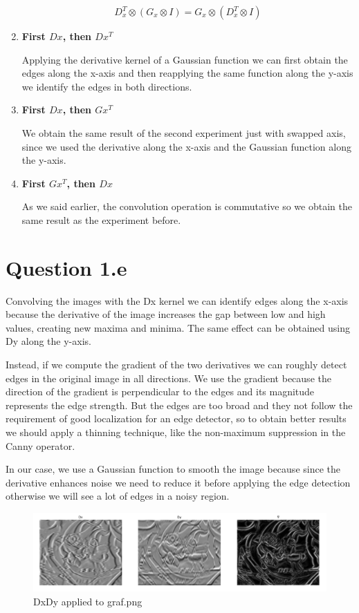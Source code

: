 \documentclass{article}
\begin{document}
\begin{enumerate}
\begin{equation}
D_x^T \otimes (G_x \otimes I) = G_x \otimes (D_x^T \otimes I)
\end{equation}

\item \textbf{First $Dx$, then $Dx^T$}

Applying the derivative kernel of a Gaussian function we can first obtain the edges along the x-axis and then reapplying the same function along the y-axis we identify the edges in both directions.

\item \textbf{First $Dx$, then $Gx^T$}

We obtain the same result of the second experiment just with swapped axis, since we used the derivative along the x-axis and the Gaussian function along the y-axis.

\item \textbf{First $Gx^T$, then $Dx$}

As we said earlier, the convolution operation is commutative so we obtain the same result as the experiment before.

\end{enumerate}

\section*{Question 1.e}

Convolving the images with the Dx kernel we can identify edges along the x-axis because the derivative of the image increases the gap between low and high values, creating new maxima and minima. The same effect can be obtained using Dy along the y-axis.

Instead, if we compute the gradient of the two derivatives we can roughly detect edges in the original image in all directions. We use the gradient because the direction of the gradient is perpendicular to the edges and its magnitude represents the edge strength.
But the edges are too broad and they not follow the requirement of good localization for an edge detector, so to obtain better results we should apply a thinning technique, like the non-maximum suppression in the Canny operator.

In our case, we use a Gaussian function to smooth the image because since the derivative enhances noise we need to reduce it before applying the edge detection otherwise we will see a lot of edges in a noisy region.

\begin{figure}[ht]
\centering
\includegraphics[width=\textwidth]{result_graf}
\caption{DxDy applied to graf.png}
\label{fig:res-graf}
\end{figure}
\end{document}
